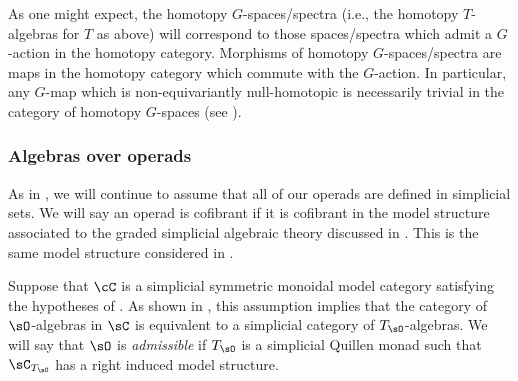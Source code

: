\documentclass[leqno,oneside,english]{elsarticle}
\begin{document}
\begin{remark}\label{rem:homotopy-G-spaces}
  As one might expect, the homotopy $G$-spaces/spectra (i.e., the homotopy
  $T$-algebras for $T$ as above) will correspond to those spaces/spectra
  which admit a $G$-action in the homotopy category. Morphisms of
  homotopy $G$-spaces/spectra are maps in the homotopy category which
  commute with the $G$-action. In particular, any $G$-map which is
  non-equivariantly null-homotopic is necessarily trivial in the
  category of homotopy $G$-spaces (see ).
\end{remark}

\subsubsection{Algebras over operads}
As in , we will continue to assume that all of our operads are defined in simplicial sets. We will say an operad is cofibrant if it is cofibrant in the model structure associated to the graded simplicial algebraic theory discussed in . This is the same model structure considered in \cite[\S~3.3.1]{BeM03}. 

Suppose that $\cC$ is a simplicial symmetric monoidal model category satisfying the hypotheses of . As shown in , this assumption implies that the category of $\sO$-algebras in $\sC$ is equivalent to a simplicial category of $T_{\sO}$-algebras. We will say that $\sO$ is \emph{admissible} if $T_{\sO}$ is a simplicial Quillen monad such that $\sC_{T_{\sO}}$ has a right induced model structure. 
\end{document}
